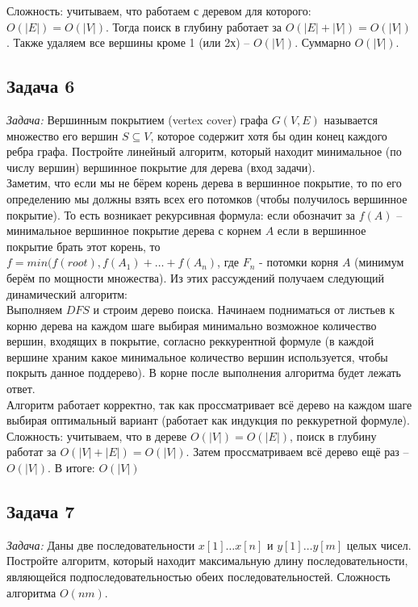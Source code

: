 \documentclass[a4paper,12pt]{article} %
\begin{document}
Сложность: учитываем, что работаем с деревом для которого: $ O(|E|) = O(|V|) $. Тогда поиск в глубину работает за $ O(|E|+|V|) = O(|V|) $. Также удаляем все вершины кроме 1 (или 2х) -- $ O(|V|) $. Суммарно $ O(|V|) $.


\subsection*{Задача 6}
\textit{Задача:} Вершинным покрытием (vertex cover) графа $G(V,E)$ называется множество его вершин $S \subseteq V$, которое содержит хотя бы один конец каждого ребра графа. Постройте линейный алгоритм, который находит минимальное (по числу вершин) вершинное покрытие для дерева (вход задачи).\\

Заметим, что если мы не бёрем корень дерева в вершинное покрытие, то по его определению мы должны взять всех его потомков (чтобы получилось вершинное покрытие). То есть возникает рекурсивная формула: если обозначит за $ f(A) $ -- минимальное вершинное покрытие дерева с корнем $ A $ если в вершинное покрытие брать этот корень, то \\
$ f = min(f(root), f(A_1) + \ldots + f(A_n) $, где $  F_n $ - потомки корня $ A $ (минимум берём по мощности множества). Из этих рассуждений получаем следующий динамический алгоритм:\\
Выполняем $ DFS $ и строим дерево поиска. Начинаем подниматься от листьев к корню дерева на каждом шаге выбирая минимально возможное количество вершин, входящих в покрытие, согласно реккурентной формуле (в каждой вершине храним какое минимальное количество вершин используется, чтобы покрыть данное поддерево). В корне после выполнения алгоритма будет лежать ответ.\\

Алгоритм работает корректно, так как проссматривает всё дерево на каждом шаге выбирая оптимальный вариант (работает как индукция по реккуретной формуле).\\

Сложность: учитываем, что в дереве $ O(|V|) = O(|E|) $, поиск в глубину работат за $ O(|V|+|E|) = O(|V|) $. Затем проссматриваем всё дерево ещё раз -- $ O(|V|) $. В итоге: $ O(|V|) $





\subsection*{Задача 7}
\textit{Задача:} Даны две последовательности $x[1] \ldots x[n]$
и $y[1] \ldots y[m]$ целых чисел. Постройте алгоритм, который находит максимальную
длину последовательности, являющейся подпоследовательностью
обеих последовательностей. Сложность алгоритма $O(nm)$.\\
\end{document}
